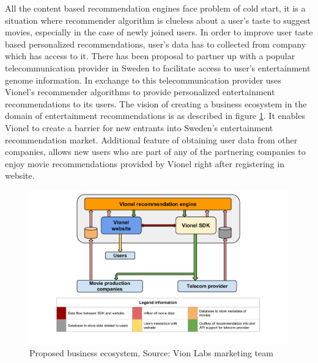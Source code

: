     All the content based recommendation engines face problem of cold start, it is a situation where recommender algorithm is clueless about a user's taste to suggest movies, especially in the case of newly joined users. In order to improve user taste based personalized recommendations, user's data has to collected from company which has access to it. There has been proposal to partner up with a popular telecommunication provider in Sweden to facilitate access to user's entertainment genome information. In exchange to this telecommunication provider uses Vionel's recommender algorithms to provide personalized entertainment recommendations to its users. The vision of creating a business ecosystem in the domain of entertainment recommendations is as described in figure \ref{fig: Proposed business ecosystem}. It enables Vionel to create a barrier for new entrants into Sweden's entertainment recommendation market. Additional feature of obtaining user data from other companies, allows new users who are part of any of the partnering companies to enjoy movie recommendations provided by Vionel right after registering in website.

    \begin{figure}[htbp]
	\centering
		\includegraphics[scale=0.5]{Figures/Business_ecosystem.pdf}
	\caption[Figure: Proposed business ecosystem]{Proposed business ecosystem, Source: Vion Labs marketing team}
	\label{fig: Proposed business ecosystem}
    \end{figure}  

